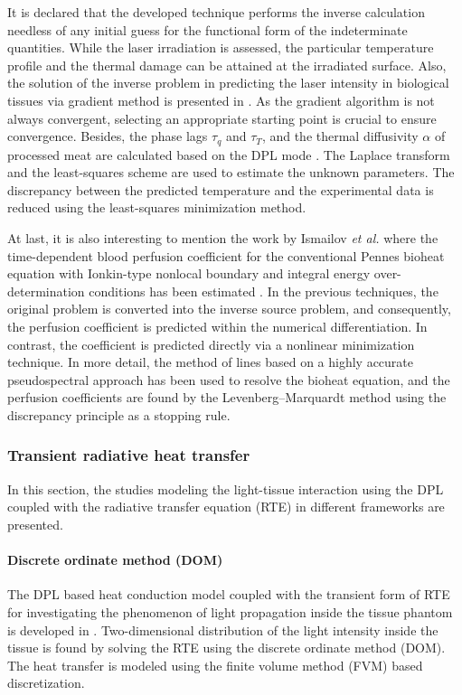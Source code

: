 \documentclass[sn-mathphys]{sn-jnl}%
\theoremstyle{thmstyleone}%
\theoremstyle{thmstyletwo}%
\theoremstyle{thmstylethree}%
\begin{document}
It is declared that the developed technique performs the inverse calculation needless of any initial guess for the functional form of the indeterminate quantities. While the laser irradiation is assessed, the particular temperature profile and the thermal damage can be attained at the irradiated surface. Also, the solution of the inverse problem in predicting the laser intensity in biological tissues via gradient method is presented in \cite{Majchrzak2019}. As the gradient algorithm is not always convergent, selecting an appropriate starting point is crucial to ensure convergence. Besides, the phase lags $\tau_q$ and $\tau_T$, and the thermal diffusivity $\alpha$ of processed meat are calculated based on the DPL mode \cite{KCLiu2016}. The Laplace transform and the least-squares scheme are used to estimate the unknown parameters. The discrepancy between the predicted temperature and the experimental data is reduced using the least-squares minimization method.

At last, it is also interesting to mention the work by Ismailov \emph{et al.} where the time-dependent blood perfusion coefficient for the conventional Pennes bioheat equation with Ionkin-type nonlocal boundary and integral energy over-determination conditions has been estimated \cite{Ismailov2018}. In the previous techniques, the original problem is converted into the inverse source problem, and consequently, the perfusion coefficient is predicted within the numerical differentiation. In contrast, the coefficient is predicted directly via a nonlinear minimization technique. In more detail, the method of lines based on a highly accurate pseudospectral approach has been used to resolve the bioheat equation, and the perfusion coefficients are found by the Levenberg–Marquardt method using the discrepancy principle as a stopping rule.

\subsubsection{Transient radiative heat transfer}
In this section, the studies modeling the light-tissue interaction using the DPL coupled with the radiative transfer equation (RTE) in different frameworks are presented.
\paragraph{Discrete ordinate method (DOM)}
The DPL based heat conduction model coupled with the transient form of RTE for investigating the phenomenon of light propagation inside the tissue phantom is developed in \cite{SKumar2015}. Two-dimensional distribution of the light intensity inside the tissue is found by solving the RTE using the discrete ordinate method (DOM). The heat transfer is modeled using the finite volume method (FVM) based discretization.
\end{document}
